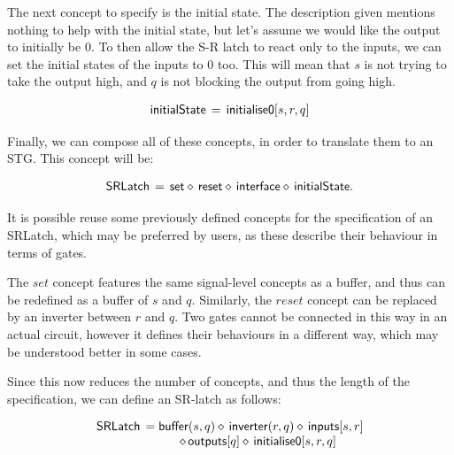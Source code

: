 \documentclass[british, journal]{IEEEtran}
\begin{document}
\noindent The next concept to specify is the initial state. The description given mentions nothing
to help with the initial state, but let's assume we would like the output to initially be 0. 
To then allow the S-R latch to react only to the inputs, we can set the initial states of the 
inputs to 0 too. This will mean that $s$ is not trying to take the output high, and $q$ is not
blocking the output from going high. 

\[
\begin{array}{lcl}
\mathsf{initialState}&\hspace{-2mm}=&\hspace{-2mm}\mathsf{initialise0} [s, r, q]
\end{array}
\]

\noindent Finally, we can compose all of these concepts, in order to translate them to an STG. This concept will be:

\[
\begin{array}{lcl}
\mathsf{SRLatch}&\hspace{-2mm}=&\hspace{-2mm}\mathsf{set} \diamond\, \mathsf{reset} \diamond\, \mathsf{interface} 
\diamond\, \mathsf{initialState}.
\end{array}
\]

\noindent It is possible reuse some previously defined concepts for the specification of an SRLatch,
which may be preferred by users, as these describe their behaviour in terms of gates.  

The $set$ concept features the same signal-level concepts as a buffer, and thus can be redefined
as a buffer of $s$ and $q$. Similarly, the $reset$ concept can be replaced by an inverter between
$r$ and $q$. Two gates cannot be connected in this way in an actual circuit, however
it defines their behaviours in a different way, which may be understood better in some cases.

Since this now reduces the number of concepts, and thus the length of the specification, we
can define an SR-latch as follows:

\vspace{-3mm}

 \[
\begin{array}{lcl}
\mathsf{SRLatch}&\hspace{-2mm}=\mathsf{buffer}(s, q) \diamond\, \mathsf{inverter}(r, q) \diamond\, \mathsf{inputs}[s, r]\\ 
&\diamond\, \mathsf{outputs}[q] \diamond\, \mathsf{initialise0} [s, r, q]
\end{array}
\]
\end{document}
